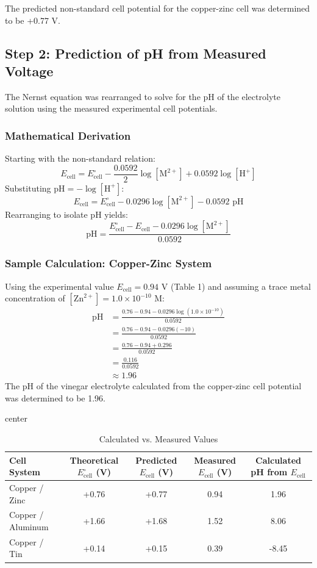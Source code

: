\documentclass[11pt]{article}
\begin{document}
The predicted non-standard cell potential for the copper-zinc cell was determined to be +0.77 V.

\newpage

\subsection*{Step 2: Prediction of pH from Measured Voltage}
The Nernst equation was rearranged to solve for the pH of the electrolyte solution using the measured experimental cell potentials.

\subsubsection*{Mathematical Derivation}
Starting with the non-standard relation:
\[ E_{\text{cell}} = E^\circ_{\text{cell}} - \frac{0.0592}{2}\log[\text{M}^{2+}] + 0.0592\log[\text{H}^+] \]
Substituting $\text{pH} = -\log[\text{H}^+]$:
\[ E_{\text{cell}} = E^\circ_{\text{cell}} - 0.0296\log[\text{M}^{2+}] - 0.0592\text{ pH} \]
Rearranging to isolate pH yields:
\[ \text{pH} = \frac{E^\circ_{\text{cell}} - E_{\text{cell}} - 0.0296\log[\text{M}^{2+}]}{0.0592} \]

\subsubsection*{Sample Calculation: Copper-Zinc System}
Using the experimental value $E_{\text{cell}} = 0.94\text{ V}$ (Table 1) and assuming a trace metal concentration of $[\text{Zn}^{2+}] = 1.0 \times 10^{-10}\text{ M}$:
\begin{align*}
    \text{pH} &= \frac{0.76 - 0.94 - 0.0296\log(1.0 \times 10^{-10})}{0.0592} \\
    &= \frac{0.76 - 0.94 - 0.0296(-10)}{0.0592} \\
    &= \frac{0.76 - 0.94 + 0.296}{0.0592} \\
    &= \frac{0.116}{0.0592} \\
    &\approx \mathbf{1.96}
\end{align*}
The pH of the vinegar electrolyte calculated from the copper-zinc cell potential was determined to be 1.96.


\begin{table}[ht]
  \caption{Calculated vs. Measured Values}
\begin{adjustbox}{center}
\begin{tabular}{l c c c c}
\toprule
Cell System & Theoretical $E^\circ_{\text{cell}}$ (V) & Predicted $E_{\text{cell}}$ (V) & Measured $E_{\text{cell}}$ (V) & Calculated pH from $E_{\text{cell}}$ \\
\midrule
Copper / Zinc & +0.76 & +0.77 & 0.94 & 1.96 \\
Copper / Aluminum & +1.66 & +1.68 & 1.52 & 8.06 \\
Copper / Tin & +0.14 & +0.15 & 0.39 & -8.45 \\
\bottomrule
\end{tabular}
\end{adjustbox}
\end{table}
\end{document}
